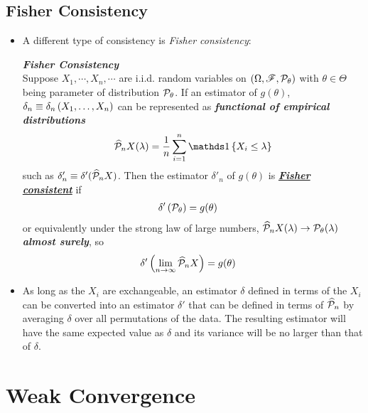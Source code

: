 \documentclass[11pt]{article}
\begin{document}
\subsection{Fisher Consistency}
\begin{itemize}
\item A different type of consistency is \emph{Fisher consistency}: 
\begin{definition}  \emph{\textbf{Fisher Consistency}}\\
Suppose $X_{1},\cdots, X_{n}, \cdots$ are i.i.d. random variables on $(\Omega, {\mathscr F}, {\mathcal P}_{\theta})$ with $\theta\in \Theta$ being parameter of distribution ${\mathcal P}_{\theta}$. If an estimator of $g(\theta)$, $\delta_{n}\equiv  \delta_{n}\left(X_{1},\ldots, X_{n}\right)$ can be represented as \emph{\textbf{functional of empirical distributions}}
\begin{align*}
\widehat{\cP}_{n}X(\lambda)=\frac{1}{n} \sum_{i=1}^{n}\ind{X_{i}\le \lambda}
\end{align*}
 such as $\delta'_{n}\equiv \delta'(\widehat{{\mathcal P}}_{n}X)$. Then the estimator  $\delta'_{n}$ of $g(\theta)$ is \underline{\emph{\textbf{Fisher consistent}}} if
\begin{align*}
\delta'\left({\mathcal P}_{\theta}\right) &= g(\theta)
\end{align*} or equivalently under the strong law of large numbers, $\widehat{{\mathcal P}}_{n}X(\lambda)\rightarrow {\mathcal P}_{\theta}(\lambda)$ \emph{\textbf{almost surely}}, so 
\begin{align*}
\delta'\left(\lim\limits_{n\rightarrow \infty}\widehat{{\mathcal P}}_{n}X\right) &= g(\theta)
\end{align*}
\end{definition}

\item \begin{remark}
As long as the $X_i$ are exchangeable, an estimator $\delta$ defined in terms of the $X_i$ can be converted into an estimator $\delta'$ that can be defined in terms of $\widehat{{\mathcal P}}_{n}$ by averaging $\delta$ over all permutations of the data. The resulting estimator will have the same expected value as $\delta$ and its variance will be no larger than that of $\delta$.
\end{remark}
\end{itemize}

\section{Weak Convergence}
\end{document}
